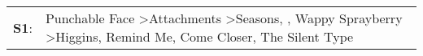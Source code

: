 \begin{supertabular}{p{0.03\textwidth}p{0.92\textwidth}}
 \textbf{S1}:  &  Punchable Face\textsuperscript{} \textgreater \enspace Attachments\textsuperscript{} \textgreater \enspace Seasons\textsuperscript{}, \textsuperscript{}, \enspace Wappy Sprayberry\textsuperscript{} \textgreater \enspace Higgins\textsuperscript{}, \enspace Remind Me\textsuperscript{}, \enspace Come Closer\textsuperscript{}, \enspace The Silent Type\textsuperscript{}  \enspace  \\
\end{supertabular}
